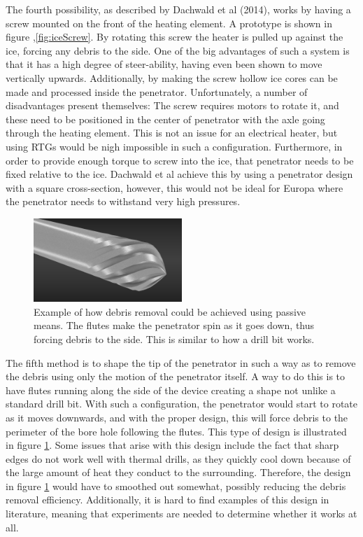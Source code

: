 \noindent
The fourth possibility, as described by Dachwald et al (2014)\cite{article:dachwald2014a}, works by having a screw mounted on the front of the heating element. A prototype is shown in figure ,\ref{fig:iceScrew}. By rotating this screw the heater is pulled up against the ice, forcing any debris to the side. One of the big advantages of such a system is that it has a high degree of steer-ability, having even been shown to move vertically upwards\cite{article:dachwald2014a}.  
Additionally, by making the screw hollow ice cores can be made and processed inside the penetrator. Unfortunately, a number of disadvantages present themselves: The screw requires motors to rotate it, and these need to be positioned in the center of penetrator with the axle going through the heating element. This is not an issue for an electrical heater, but using RTGs would be nigh impossible in such a configuration. Furthermore, in order to provide enough torque to screw into the ice, that penetrator needs to be fixed relative to the ice. Dachwald et al achieve this by using a penetrator design with a square cross-section, however, this would not be ideal for Europa where the penetrator needs to withstand very high pressures.\\

 \begin{figure}[ht]
 	\centering
 	\includegraphics[width=0.5\textwidth]{figures/LAMC/flutedHead}
 	\caption{Example of how debris removal could be achieved using passive means. The flutes make the penetrator spin as it goes down, thus forcing debris to the side. This is similar to how a drill bit works.}
 	\label{fig:flutedHead}
 \end{figure}  

\noindent
The fifth method is to shape the tip of the penetrator in such a way as to remove the debris using only the motion of the penetrator itself. A way to do this is to have flutes running along the side of the device creating a shape not unlike a standard drill bit. With such a configuration, the penetrator would start to rotate as it moves downwards, and with the proper design, this will force debris to the perimeter of the bore hole following the flutes. This type of design is illustrated in figure \ref{fig:flutedHead}.  
Some issues that arise with this design include the fact that sharp edges do not work well with thermal drills, as they quickly cool down because of the large amount of heat they conduct to the surrounding. Therefore, the design in figure \ref{fig:flutedHead} would have to smoothed out somewhat, possibly reducing the debris removal efficiency. Additionally, it is hard to find examples of this design in literature, meaning that experiments are needed to determine whether it works at all. \\

